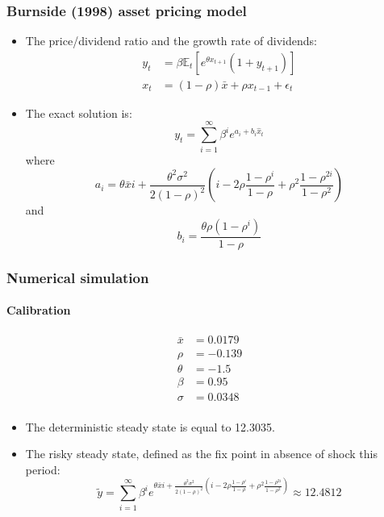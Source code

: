 \documentclass{beamer}
\begin{document}
\begin{frame}
   \frametitle{Burnside (1998) asset pricing model}

   \begin{itemize}

      \item The price/dividend ratio and the growth rate of dividends:
            \[
               \begin{split}
                  y_t & = \beta \mathbb E_t\left[e^{\theta x_{t+1}}\left(1+y_{t+1}\right)\right] \\
                  x_t & = (1-\rho)\bar x + \rho x_{t-1}+\epsilon_t
               \end{split}
            \]

      \item The exact solution is:
            \[
               y_t = \sum_{i=1}^\infty \beta^i e^{a_i+b_i\hat x_t}
            \]
            where
            \[
               a_i = \theta \bar x i +
               \frac{\theta^2\sigma^2}{2(1-\rho)^2}\left(i-2\rho\frac{1-\rho^i}{1-\rho}+\rho^2\frac{1-\rho^{2i}}{1-\rho^2}\right)
            \]
            and
            \[
               b_i = \frac{\theta\rho\left(1-\rho^i\right)}{1-\rho}
            \]

   \end{itemize}

\end{frame}


\begin{frame}
   \frametitle{Numerical simulation}
   \framesubtitle{Calibration}

   \begin{align*}
      \bar x & = 0.0179  \\
      \rho   & =  -0.139 \\
      \theta & = -1.5    \\
      \beta  & = 0.95    \\
      \sigma & = 0.0348  \\
   \end{align*}

   \medskip

   \begin{itemize}
      \item The deterministic steady state is equal to 12.3035.\newline
      \item The risky steady state, defined as the fix point in absence of
            shock this period:
            \[
               \widetilde y = \sum_{i=1}^\infty \beta^i e^{\theta \bar x i +
                     \frac{\theta^2\sigma^2}{2(1-\rho)^2}\left(i-2\rho\frac{1-\rho^i}{1-\rho}+\rho^2\frac{1-\rho^{2i}}{1-\rho^2}\right)}\approx 12.4812
            \]

   \end{itemize}

\end{frame}
\end{document}
